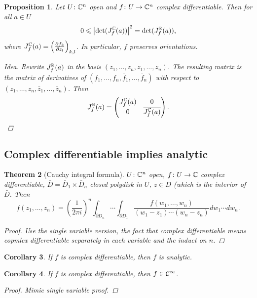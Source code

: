 \documentclass[A4paper, british, reqno]{amsart}
\theoremstyle{darkgreentheorem}
\newtheorem{thm}{Theorem}[section]
\newtheorem{prop}[thm]{Proposition}
\newtheorem{cor}[thm]{Corollary}
\theoremstyle{darkbluedefinition}
\theoremstyle{darkredexample}
\theoremstyle{remark}
\newcommand{\1}{\mathbbm{1}}
\begin{document}
\begin{prop}
    Let $U\colon \mathbb{C}^{n}$ open and $f\colon U\to \mathbb{C}^{n}$ complex differentiable.
    Then for all $a\in U$
    \[ 0\leqslant \left| \det(J_{f}^{\mathbb{C}}(a))\right|^{2}=\det(J_{f}^{\mathbb{R}}(a)),\]
    where $J_{f}^{\mathbb{C}}(a)=\left(\frac{\partial f_{k}}{\partial z_{l}}\right)_{k,l}$.
    In particular, $f$ preserves orientations.
    \begin{proof}[Idea]
	Rewrite $J_{f}^{\mathbb{R}}(a)$ in the basis $(z_{1},\ldots, z_{n},\bar{z}_{1},\ldots,\bar{z}_{n})$.
	The resulting matrix is the matrix of derivatives of $(f_{1},\ldots,f_{n},\bar{f}_{1},\ldots,\bar{f}_{n})$ with respect to $(z_{1},\ldots,z_{n},\bar{z}_{1},\ldots,\bar{z}_{n})$.
	Then
	\[ J_{f}^{\mathbb{R}}(a)=\begin{pmatrix} J_{f}^{\mathbb{C}}(a) & 0 \\ 0 & \overline{J_{f}^{\mathbb{C}}(a)}\end{pmatrix}. \]
    \end{proof}
\end{prop}

\subsection{Complex differentiable implies analytic}

\begin{thm}[Cauchy integral formula]
    $U\colon \mathbb{C}^{n}$ open, $f\colon U\to \mathbb{C}$ complex differentiable, $\bar{D}=\bar{D}_{1}\times \bar{D}_{n}$ closed polydisk in $U$, $z\in D$ (which is the interior of $\bar{D}$.
    Then
    \[f(z_{1},\ldots,z_{n})=\left(\frac{1}{2\pi i}\right)^{n}\int_{\partial D_{n}}\cdots \int_{\partial D_{1}}\frac{f(w_{1},\ldots,w_{n})}{(w_{1}-z_{1})\cdots (w_{n}-z_{n})}dw_{1}\cdots dw_{n}.\]
    \begin{proof}
	Use the single variable version, the fact that complex differentiable means copmlex differentiable separately in each variable and the induct on $n$.
    \end{proof}
\end{thm}

\begin{cor}
    If $f$ is complex differentiable, then $f$ is analytic.
\end{cor}

\begin{cor}
    If $f$ is complex differentiable, then $f\in \mathcal{C}^{\infty}$.
    \begin{proof}
	Mimic single variable proof.
    \end{proof}
\end{cor}
\end{document}
